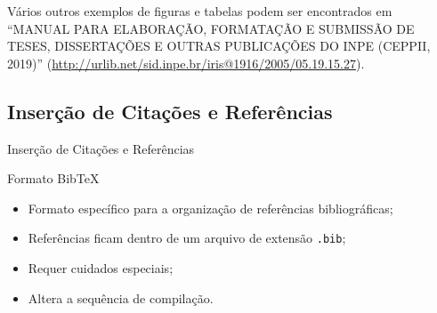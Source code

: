 \documentclass[10pt]{beamer}
\begin{document}
\begin{frame}[plain]{}
    \begin{marker}
        Vários outros exemplos de figuras e tabelas podem ser encontrados em ``MANUAL PARA ELABORAÇÃO, FORMATAÇÃO E SUBMISSÃO DE TESES, DISSERTAÇÕES E OUTRAS PUBLICAÇÕES DO INPE (CEPPII, 2019)'' (\url{http://urlib.net/sid.inpe.br/iris@1916/2005/05.19.15.27}).
    \end{marker}
\end{frame}

\subsection{Inserção de Citações e Referências}

\begin{frame}{Inserção de Citações e Referências}
    \begin{block}{Formato Bib\TeX{}}
        \vspace{1em}
        \begin{itemize}[label=\textbullet]
            \pause
            \item Formato específico para a organização de referências bibliográficas;
            \pause
            \item Referências ficam dentro de um arquivo de extensão {\tt .bib};
            \pause
            \item Requer cuidados especiais;
            \pause
            \item Altera a sequência de compilação.
        \end{itemize}
    \end{block}
\end{frame}
\end{document}
